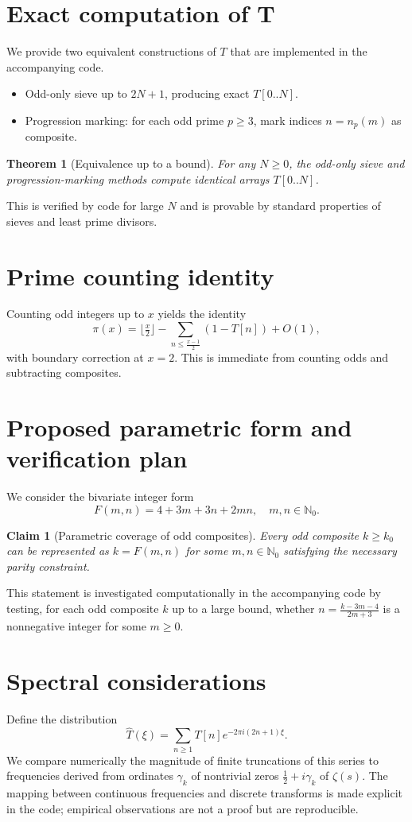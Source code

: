\documentclass[11pt]{article}
\newtheorem{theorem}{Theorem}
\newtheorem{claim}{Claim}
\theoremstyle{definition}
\theoremstyle{remark}
\begin{document}
\section{Exact computation of T}
We provide two equivalent constructions of \(T\) that are implemented in the accompanying code.
\begin{itemize}[leftmargin=*]
  \item Odd-only sieve up to \(2N+1\), producing exact \(T[0..N]\).
  \item Progression marking: for each odd prime \(p\ge3\), mark indices \(n=n_p(m)\) as composite.
\end{itemize}
\begin{theorem}[Equivalence up to a bound]\label{thm:equiv}
For any \(N\ge 0\), the odd-only sieve and progression-marking methods compute identical arrays \(T[0..N]\).
\end{theorem}
\noindent This is verified by code for large \(N\) and is provable by standard properties of sieves and least prime divisors.

\section{Prime counting identity}
Counting odd integers up to \(x\) yields the identity
\[
\pi(x) = \Big\lfloor \tfrac{x}{2} \Big\rfloor - \sum_{n\le \frac{x-1}{2}} (1-T[n]) + O(1),
\]
with boundary correction at \(x=2\). This is immediate from counting odds and subtracting composites.

\section{Proposed parametric form and verification plan}\label{sec:param}
We consider the bivariate integer form
\[
F(m,n) = 4 + 3m + 3n + 2mn, \quad m,n\in\mathbb{N}_0.
\]
\begin{claim}[Parametric coverage of odd composites]
Every odd composite \(k\ge k_0\) can be represented as \(k = F(m,n)\) for some \(m,n\in\mathbb{N}_0\) satisfying the necessary parity constraint.
\end{claim}
This statement is investigated computationally in the accompanying code by testing, for each odd composite \(k\) up to a large bound, whether 
\(n = \frac{k-3m-4}{2m+3}\) is a nonnegative integer for some \(m\ge 0\).

\section{Spectral considerations}
Define the distribution
\[
\widehat{T}(\xi) = \sum_{n\ge1} T[n] e^{-2\pi i (2n+1)\xi}.
\]
We compare numerically the magnitude of finite truncations of this series to frequencies derived from ordinates \(\gamma_k\) of nontrivial zeros \(\tfrac{1}{2}+i\gamma_k\) of \(\zeta(s)\). The mapping between continuous frequencies and discrete transforms is made explicit in the code; empirical observations are not a proof but are reproducible.
\end{document}
